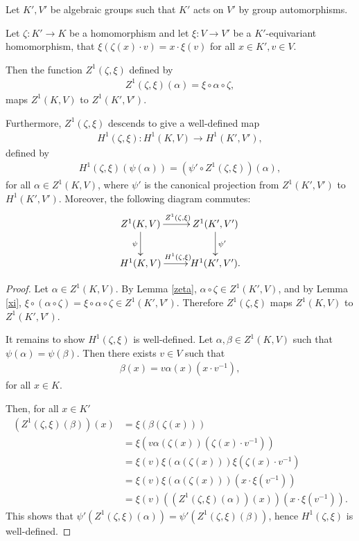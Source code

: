 \begin{lemma} \label{h1maps} Let $K', V'$ be algebraic groups such that $K'$ acts on $V'$ by group automorphisms.

	Let $\zeta:K' \rightarrow K$ be a homomorphism and let $\xi: V \rightarrow V'$ be a $K'$-equivariant homomorphism, that $\xi(\zeta(x) \cdot v) = x \cdot \xi(v)$ for all $x \in K', v \in V$.

	Then the function $Z^1(\zeta, \xi)$ defined by
	\begin{align*}
		Z^1(\zeta, \xi)(\alpha) = \xi \circ \alpha \circ \zeta,
	\end{align*}
	maps $Z^1(K, V)$ to $Z^1(K', V')$.

	Furthermore, $Z^1(\zeta, \xi)$ descends to give a well-defined map
	\begin{align*}
		H^1(\zeta, \xi):H^1(K, V) \rightarrow H^1(K', V'),
	\end{align*}
	defined by
	\begin{align*}
		H^1(\zeta, \xi)(\psi(\alpha)) = \left(\psi' \circ Z^1(\zeta, \xi)\right)(\alpha),
	\end{align*}
	for all $\alpha \in Z^1(K, V)$, where $\psi'$ is the canonical projection from $Z^1(K', V')$ to $H^1(K', V')$.
	Moreover, the following diagram commutes:
	\begin{align*}
		\xymatrix{
			Z^1(K, V) \ar[r]^{Z^1(\zeta, \xi)} \ar[d]_{\psi} & Z^1(K', V') \ar[d]^{\psi'} \\
			H^1(K, V) \ar[r]^{H^1(\zeta, \xi)}               & H^1(K', V').
		}
	\end{align*}
\end{lemma}
\begin{proof}
	Let $\alpha \in Z^1(K, V)$. By Lemma \ref{zeta}, $\alpha \circ \zeta \in Z^1(K', V)$, and by Lemma \ref{xi}, $\xi \circ \left(\alpha \circ \zeta\right) = \xi \circ \alpha \circ \zeta \in Z^1(K', V')$. Therefore $Z^1(\zeta, \xi)$ maps $Z^1(K, V)$ to $Z^1(K', V')$.

	It remains to show $H^1(\zeta, \xi)$ is well-defined. Let $\alpha,\beta \in Z^1(K, V)$ such that $\psi(\alpha) = \psi(\beta)$. Then there exists $v \in V$ such that
	\begin{align*}
		\beta(x) = v\alpha(x)(x \cdot v^{-1}),
	\end{align*}
	for all $x \in K$.

	Then, for all $x \in K'$
	\begin{align*}
		\left(Z^1(\zeta, \xi)(\beta)\right)(x) &= \xi\left(\beta(\zeta(x))\right) \\
			&= \xi \left( v \alpha(\zeta(x))\left(\zeta(x) \cdot v^{-1}\right) \right) \\
			&= \xi(v) \xi(\alpha(\zeta(x))) \xi\left( \zeta(x) \cdot v^{-1}\right) \\
			&= \xi(v) \xi(\alpha(\zeta(x)))\left(x \cdot \xi(v^{-1})\right) \\
			&= \xi(v) \left(\left(Z^1(\zeta, \xi)(\alpha)\right)(x)\right) \left(x \cdot \xi(v^{-1})\right).
	\end{align*}
	This shows that $\psi'\left(Z^1(\zeta, \xi)(\alpha)\right) = \psi'\left(Z^1(\zeta, \xi)(\beta)\right)$, hence $H^1(\zeta, \xi)$ is well-defined.
\end{proof} 

